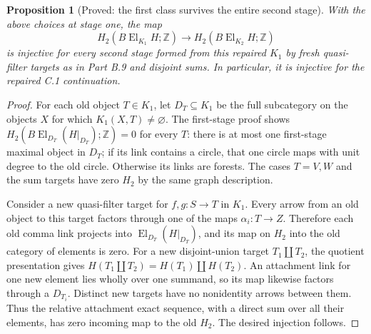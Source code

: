 \documentclass[11pt,a4paper]{article}
\newtheorem{proposition}[theorem]{Proposition}
\theoremstyle{definition}
\begin{document}
\begin{proposition}[Proved: the first class survives the entire second stage]\label{C:K2-injective}
With the above choices at stage one, the map
\[
 H_2(B\operatorname{El}_{K_1}H;\mathbb Z)
 \longrightarrow H_2(B\operatorname{El}_{K_2}H;\mathbb Z)
\]
is injective for every second stage formed from this repaired $K_1$
by fresh quasi-filter targets as in Part B.9 and disjoint sums. In
particular, it is injective for the repaired C.1 continuation.
\end{proposition}
\begin{proof}
For each old object $T\in K_1$, let $D_T\subseteq K_1$ be the full
subcategory on the objects $X$ for which $K_1(X,T)\ne\varnothing$.
The first-stage proof shows
$H_2(B\operatorname{El}_{D_T}(H|_{D_T});\mathbb Z)=0$ for every $T$:
there is at most one first-stage maximal object in $D_T$; if its link
contains a circle, that one circle maps with unit degree to the old
circle.  Otherwise its links are forests.  The cases $T=V,W$ and the
sum targets have zero $H_2$ by the same graph description.

Consider a new quasi-filter target for $f,g:S\to T$ in $K_1$.
Every arrow from an old object to this target factors through one of
the maps $\alpha_i:T\to Z$.  Therefore each old comma link projects
into $\operatorname{El}_{D_T}(H|_{D_T})$, and its map on $H_2$ into the
old category of elements is zero.  For a new disjoint-union target
$T_1\amalg T_2$, the quotient presentation gives
$H(T_1\amalg T_2)=H(T_1)\amalg H(T_2)$.  An attachment link for one
new element lies wholly over one summand, so its map likewise factors
through a $D_{T_i}$.  Distinct new targets have no nonidentity arrows
between them.  Thus the relative attachment exact sequence, with a
direct sum over all their elements, has zero incoming map to the old
$H_2$.  The desired injection follows.
\end{proof}
\end{document}
